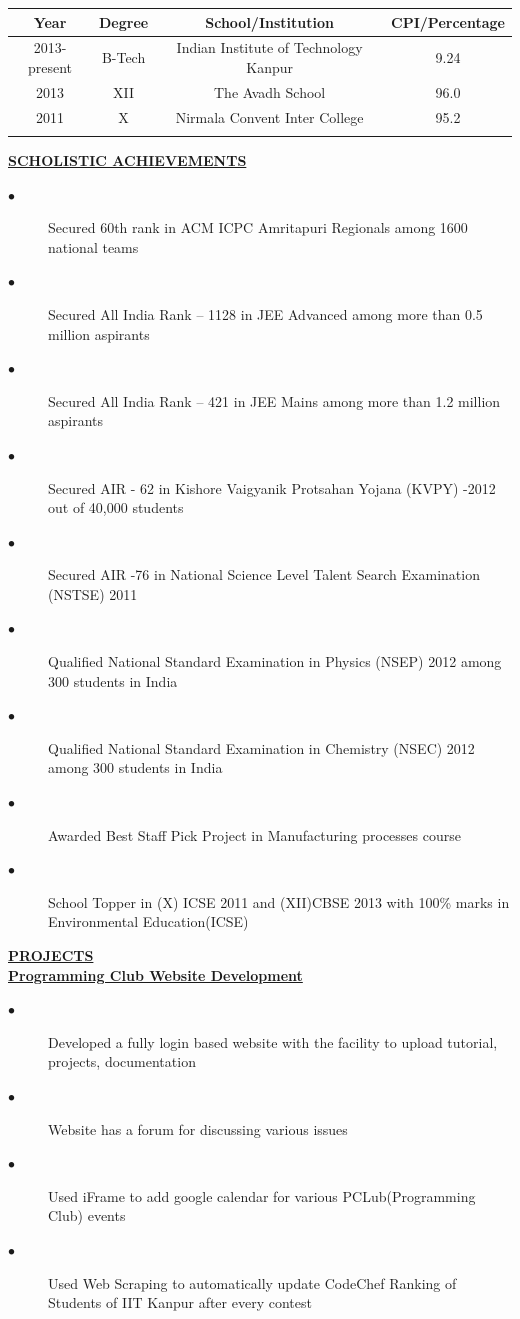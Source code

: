 \documentclass[10pt]{article}
\begin{document}
\begin{flushleft}
\begin{tabular}{c c c c}
\hline \hline
Year & Degree & School/Institution & CPI/Percentage\\
\hline
2013-present & B-Tech & Indian Institute of Technology Kanpur & 9.24\\
2013 & XII & The Avadh School & 96.0 \\
2011 & X & Nirmala Convent Inter College & 95.2\\
\hline \\
\end{tabular}
{\large \textbf{\underline{SCHOLISTIC ACHIEVEMENTS}}}
\begin{description}
\item[$\bullet$]Secured 60th rank in ACM ICPC Amritapuri Regionals among 1600 national teams
\item[$\bullet$]Secured All India Rank – 1128 in JEE Advanced among more than 0.5 million aspirants
\item[$\bullet$]Secured All India Rank – 421 in JEE Mains among more than 1.2 million aspirants
\item[$\bullet$]Secured AIR - 62 in Kishore Vaigyanik Protsahan Yojana (KVPY) -2012 out of 40,000 students
\item[$\bullet$]Secured AIR -76 in National Science Level Talent Search Examination (NSTSE) 2011
\item[$\bullet$]Qualified National Standard Examination in Physics (NSEP) 2012 among 300 students in India
\item[$\bullet$]Qualified National Standard Examination in Chemistry (NSEC) 2012 among 300 students in India
\item[$\bullet$]Awarded Best Staff Pick Project in Manufacturing processes course
\item[$\bullet$]School Topper in (X) ICSE 2011 and (XII)CBSE 2013  with 100\% marks in Environmental Education(ICSE)
\end{description}
{\large \textbf{\underline{PROJECTS}}}\\
\textbf{\underline{Programming Club Website Development}}
\begin{description}
\item[$\bullet$]Developed a fully login based website with the facility to upload tutorial, projects, documentation
\item[$\bullet$]Website has a forum for discussing various issues
\item[$\bullet$]Used iFrame to add google calendar for various PCLub(Programming Club) events
\item[$\bullet$]Used Web Scraping to automatically update CodeChef Ranking of Students of IIT Kanpur after every contest

\end{description}
\end{flushleft}
\end{document}
